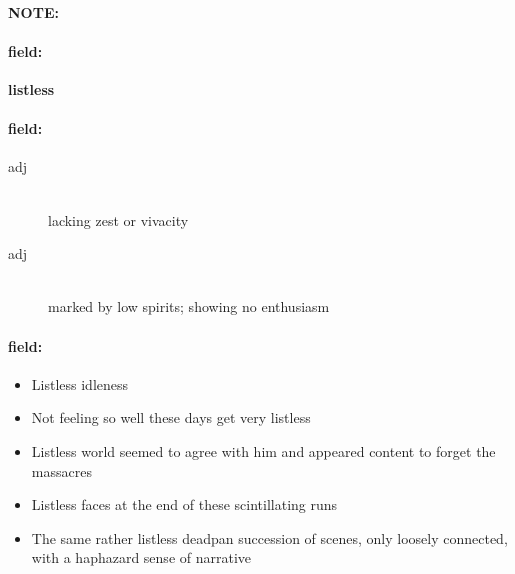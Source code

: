 \documentclass[12pt]{article}
\newenvironment{note}{\paragraph{NOTE:}}{}
\newenvironment{field}{\paragraph{field:}}{}
\begin{document}
\begin{note}
\begin{field}
\textbf{\large listless}
\end{field}


\begin{field}
\begin{description}
\item[adj] \hfill \\ 
lacking zest or vivacity

\item[adj] \hfill \\ 
marked by low spirits; showing no enthusiasm

\end{description}
\end{field}

\begin{field}
\begin{itemize}
\item Listless idleness
\item Not feeling so well these days get very listless
\item Listless world seemed to agree with him and appeared content to forget the massacres
\item Listless faces at the end of these scintillating runs
\item The same rather listless deadpan succession of scenes, only loosely connected, with a haphazard sense of narrative
\end{itemize}
\end{field}
\end{note}
\end{document}
